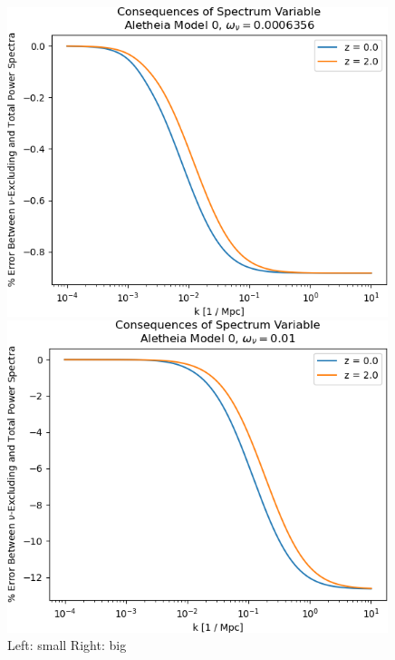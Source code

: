 \documentclass[11pt]{article}
\begin{document}
\begin{figure}
    \centering
    \begin{minipage}[t]{.49\textwidth}
        \raggedleft
        \includegraphics[width=0.99\textwidth]{line_by_line/spectrum_variable/low_omnuh2}
    \end{minipage}
    \begin{minipage}[t]{.49\textwidth}
        \raggedright
        \includegraphics[width=0.99\textwidth]{line_by_line/spectrum_variable/high_omnuh2}
    \end{minipage}
    \caption{Left: small Right: big}
    \label{fig: spectrum_type}
\end{figure}
\end{document}
